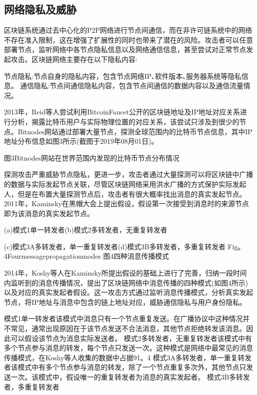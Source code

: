\subsection{网络隐私及威胁}

区块链系统通过去中心化的P2P网络进行节点间通信，而在非许可链系统中的网络不存在准入限制，这在增强了扩展性的同时也带来了潜在的风险。攻击者可以任意部署节点，监听网络中各节点隐私信息以及网络通信信息，甚至尝试对正常节点发起攻击。区块链网络主要存在以下隐私内容:

节点隐私:节点自身的隐私内容，包含节点网络IP､软件版本､服务器系统等隐私信息。
通信隐私:节点间通信隐私内容，包含节点间通信的数据内容以及通信流量情况。

2013年，Reid等人尝试利用BitcoinFaucet公开的区块链地址及IP地址对应关系进行分析，揭露比特币用户与实际物理位置的对应关系，该尝试只涉及到很少的节点。Bitnodes网站通过部署大量节点，探测全球范围内的比特币节点信息，其中IP地址分布信息如图3所示(截图于2019年08月01日)。

图3Bitnodes网站在世界范围内发现的比特币节点分布情况

探测攻击严重威胁节点隐私，更进一步，攻击者通过大量探测可以将区块链中广播的数据与实际发起节点关联，尽管区块链网络采用洪水广播的方式保护实际发起人，但是在布置大量探测节点后，攻击者有很大概率找出消息的真实发起节点。2011年，Kaminsky在黑帽大会上提出假设，假设第一次接受到消息时的来源节点即为该消息的真实发起节点。

(a)模式1单一转发者(b)模式2多转发者，无重复转发者


(c)模式3A多转发者，单一重复转发者(d)模式3B多转发者，多重复转发者
Fig。4Fourmessagepropagationmodes
图4四种消息传播模式

2014年，Koshy等人在Kaminsky所提出假设的基础上进行了完善，归纳一段时间内监听到的消息传播情况，提出了区块链网络中消息传播的四种模式(如图4所示)以及对应的真实发起者假设。这一攻击方式通过监听消息传播模式，分析真实发起节点，将IP地址与消息中包含的链上地址对应，威胁通信隐私与用户身份隐私。

模式1单一转发者该模式中消息只有一个节点重复发送。在广播协议中这种情况并不常见，通常出现原因在于该节点发送不合法消息，其他节点拒绝转发该消息。因此可以假设该节点为消息实际发送者。
模式2多转发者，无重复转发者该模式中有多个节点参与消息的转发，每个节点只发送一次。这种模式是网络中最常见的消息传播模式，在Koshy等人收集的数据中占据91。4%
模式3A多转发者，单一重复转发者该模式中有多个节点参与消息的转发，除了一个节点重复多次外，其他节点只发送一次。该模式中，假设唯一的重复转发者为消息的真实发起者。
模式3B多转发者，多重复转发者

